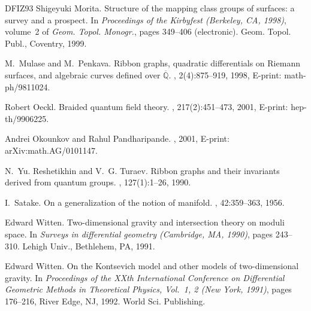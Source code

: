 \documentclass[11pt,twoside]{article}
\theoremstyle{plain}
\theoremstyle{remark}
\theoremstyle{definition}
\numberwithin{equation}{section} %
\begin{document}
\begin{thebibliography}{DFIZ93}
Shigeyuki Morita.
\newblock Structure of the mapping class groups of surfaces: a survey and a
  prospect.
\newblock In {\em Proceedings of the Kirbyfest (Berkeley, CA, 1998)}, volume~2
  of {\em Geom. Topol. Monogr.}, pages 349--406 (electronic). Geom. Topol.
  Publ., Coventry, 1999.

M.~Mulase and M.~Penkava.
\newblock Ribbon graphs, quadratic differentials on {R}iemann surfaces, and
  algebraic curves defined over {$\overline{\mathbb{Q}}$}.
, 2(4):875--919, 1998, E-print: math-ph/9811024.

Robert Oeckl.
\newblock Braided quantum field theory.
, 217(2):451--473, 2001, E-print:
  hep-th/9906225.

Andrei Okounkov and Rahul Pandharipande.
, 2001,
  E-print: arXiv:math.AG/0101147.

N.~Yu. Reshetikhin and V.~G. Turaev.
\newblock Ribbon graphs and their invariants derived from quantum groups.
, 127(1):1--26, 1990.

I.~Satake.
\newblock On a generalization of the notion of manifold.
, 42:359--363, 1956.

Edward Witten.
\newblock Two-dimensional gravity and intersection theory on moduli space.
\newblock In {\em Surveys in differential geometry (Cambridge, MA, 1990)},
  pages 243--310. Lehigh Univ., Bethlehem, PA, 1991.

Edward Witten.
\newblock On the {K}ontsevich model and other models of two-dimensional
  gravity.
\newblock In {\em Proceedings of the XXth International Conference on
  Differential Geometric Methods in Theoretical Physics, Vol.\ 1, 2 (New York,
  1991)}, pages 176--216, River Edge, NJ, 1992. World Sci. Publishing.

\end{thebibliography}
\end{document}
